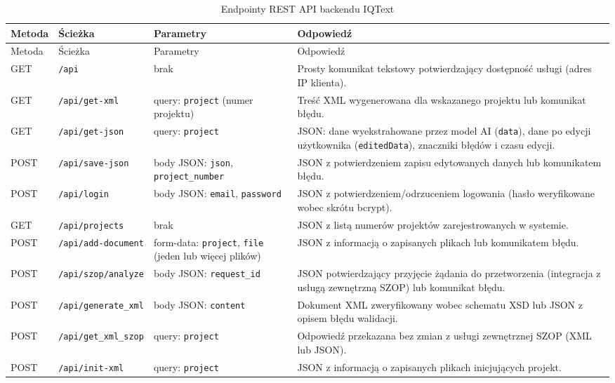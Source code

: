 \begingroup
\small
\begin{longtable}{p{} p{} p{} p{}}
\caption{Endpointy REST API backendu IQText} \\
\toprule
\rowcolor{tablehead!15}
Metoda & Ścieżka & Parametry & Odpowiedź \\
\midrule
\endfirsthead
\toprule
\rowcolor{tablehead!15}
Metoda & Ścieżka & Parametry & Odpowiedź \\
\midrule
\endhead
GET & \texttt{/api} & brak & Prosty komunikat tekstowy potwierdzający dostępność usługi (adres IP klienta). \\
GET & \texttt{/api/get-xml} & query: \texttt{project} (numer projektu) & Treść XML wygenerowana dla wskazanego projektu lub komunikat błędu. \\
GET & \texttt{/api/get-json} & query: \texttt{project} & JSON: dane wyekstrahowane przez model AI (\texttt{data}), dane po edycji użytkownika (\texttt{editedData}), znaczniki błędów i czasu edycji. \\
POST & \texttt{/api/save-json} & body JSON: \texttt{json}, \texttt{project\_number} & JSON z potwierdzeniem zapisu edytowanych danych lub komunikatem błędu. \\
POST & \texttt{/api/login} & body JSON: \texttt{email}, \texttt{password} & JSON z potwierdzeniem/odrzuceniem logowania (hasło weryfikowane wobec skrótu bcrypt). \\
GET & \texttt{/api/projects} & brak & JSON z listą numerów projektów zarejestrowanych w systemie. \\
POST & \texttt{/api/add-\allowbreak document} & form-data: \texttt{project}, \texttt{file} (jeden lub więcej plików) & JSON z informacją o zapisanych plikach lub komunikatem błędu. \\
POST & \texttt{/api/szop/\allowbreak analyze} & body JSON: \texttt{request\_id} & JSON potwierdzający przyjęcie żądania do przetworzenia (integracja z usługą zewnętrzną SZOP) lub komunikat błędu. \\
POST & \texttt{/api/generate\_\allowbreak xml} & body JSON: \texttt{content} & Dokument XML zweryfikowany wobec schematu XSD lub JSON z opisem błędu walidacji. \\
POST & \texttt{/api/get\_xml\_\allowbreak szop} & query: \texttt{project} & Odpowiedź przekazana bez zmian z usługi zewnętrznej SZOP (XML lub JSON). \\
POST & \texttt{/api/init-xml} & query: \texttt{project} & JSON z informacją o zapisanych plikach inicjujących projekt. \\
\bottomrule
\end{longtable}
\endgroup

